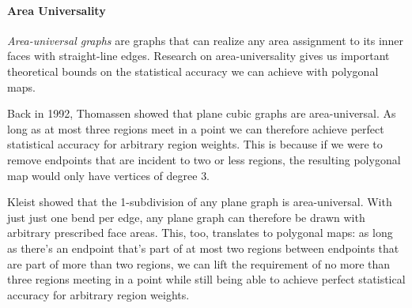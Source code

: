 \paragraph{Area Universality}

\emph{Area-universal graphs} are graphs that can realize any area assignment to its inner faces with straight-line edges.
Research on area-universality gives us important theoretical bounds on the statistical accuracy we can achieve with polygonal maps.

Back in 1992, Thomassen \cite{thomassen1992plane} showed that plane cubic graphs are area-universal.
As long as at most three regions meet in a point we can therefore achieve perfect statistical accuracy for arbitrary region weights.
This is because if we were to remove endpoints that are incident to two or less regions, the resulting polygonal map would only have vertices of degree 3.

Kleist \cite{kleist2018drawing} \cite{kleist2019planar} showed that the 1-subdivision of any plane graph is area-universal.
With just just one bend per edge, any plane graph can therefore be drawn with arbitrary prescribed face areas.
This, too, translates to polygonal maps: as long as there's an endpoint that's part of at most two regions between endpoints that are part of more than two regions, we can lift the requirement of no more than three regions meeting in a point while still being able to achieve perfect statistical accuracy for arbitrary region weights.
